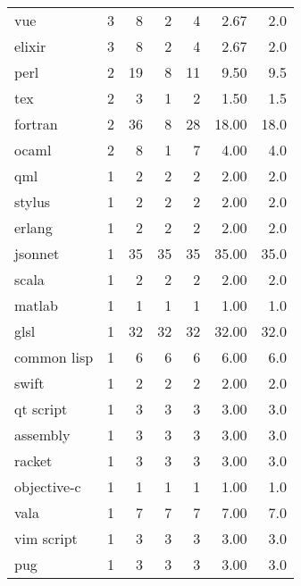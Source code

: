 \begin{tabular}{lrrrrrr}
vue              &          3 &           8 &    2 &    4 &   2.67 &      2.0 \\
elixir           &          3 &           8 &    2 &    4 &   2.67 &      2.0 \\
perl             &          2 &          19 &    8 &   11 &   9.50 &      9.5 \\
tex              &          2 &           3 &    1 &    2 &   1.50 &      1.5 \\
fortran          &          2 &          36 &    8 &   28 &  18.00 &     18.0 \\
ocaml            &          2 &           8 &    1 &    7 &   4.00 &      4.0 \\
qml              &          1 &           2 &    2 &    2 &   2.00 &      2.0 \\
stylus           &          1 &           2 &    2 &    2 &   2.00 &      2.0 \\
erlang           &          1 &           2 &    2 &    2 &   2.00 &      2.0 \\
jsonnet          &          1 &          35 &   35 &   35 &  35.00 &     35.0 \\
scala            &          1 &           2 &    2 &    2 &   2.00 &      2.0 \\
matlab           &          1 &           1 &    1 &    1 &   1.00 &      1.0 \\
glsl             &          1 &          32 &   32 &   32 &  32.00 &     32.0 \\
common lisp      &          1 &           6 &    6 &    6 &   6.00 &      6.0 \\
swift            &          1 &           2 &    2 &    2 &   2.00 &      2.0 \\
qt script        &          1 &           3 &    3 &    3 &   3.00 &      3.0 \\
assembly         &          1 &           3 &    3 &    3 &   3.00 &      3.0 \\
racket           &          1 &           3 &    3 &    3 &   3.00 &      3.0 \\
objective-c      &          1 &           1 &    1 &    1 &   1.00 &      1.0 \\
vala             &          1 &           7 &    7 &    7 &   7.00 &      7.0 \\
vim script       &          1 &           3 &    3 &    3 &   3.00 &      3.0 \\
pug              &          1 &           3 &    3 &    3 &   3.00 &      3.0 \\

\end{tabular}
